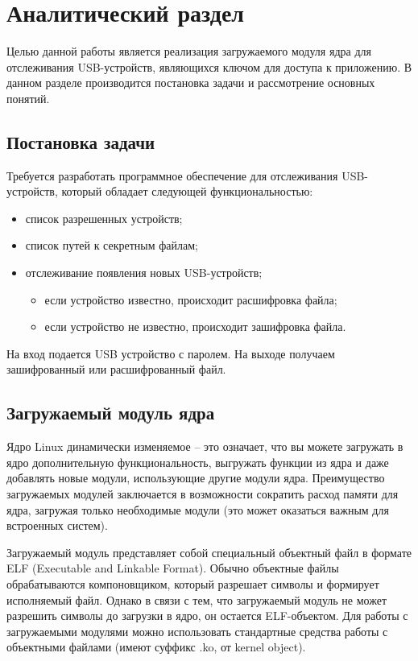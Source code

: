 \chapter{\textbf{Аналитический раздел}}
\hfill

Целью данной работы является реализация загружаемого модуля ядра для отслеживания USB­-устройств, являющихся ключом для доступа к приложению. В данном разделе производится постановка задачи и рассмотрение основных понятий. 

\section{\textbf{Постановка задачи}}

Требуется разработать программное обеспечение для отслеживания USB­-устройств, который обладает следующей функциональностью:
\begin{itemize}
\item список разрешенных устройств;
\item список путей к секретным файлам;
\item отслеживание появления новых USB­-устройств;
\begin{itemize}
\item если устройство известно, происходит расшифровка файла;
\item если устройство не известно, происходит зашифровка файла. 
\end{itemize}
\end{itemize}

На вход подается USB устройство с паролем. На выходе получаем зашифрованный или расшифрованный файл.

\section{\textbf{Загружаемый модуль ядра}}

Ядро Linux динамически изменяемое -- это означает, что вы можете загружать в ядро дополнительную функциональность, выгружать функции из ядра и даже добавлять новые модули, использующие другие модули ядра. Преимущество загружаемых модулей заключается в возможности сократить расход памяти для ядра, загружая только необходимые модули (это может оказаться важным для встроенных систем).

Загружаемый модуль представляет собой специальный объектный файл в формате ELF (Executable and Linkable Format). Обычно объектные файлы обрабатываются компоновщиком, который разрешает символы и формирует исполняемый файл. Однако в связи с тем, что загружаемый модуль не может разрешить символы до загрузки в ядро, он остается ELF-объектом. Для работы с загружаемыми модулями можно использовать стандартные средства работы с объектными файлами (имеют суффикс .ko, от kernel object). \cite{kernelmodules}


